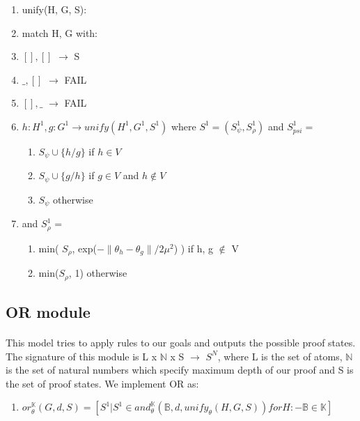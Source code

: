 \documentclass[Other]{iitddiss}
\begin{document}
\begin{enumerate}
	\item unify(H, G, S):
	\item match H, G with:
	\item \([], []\) $\rightarrow$ S
	\item \(\_, []\) $\rightarrow$ FAIL
	\item \([], \_\) $\rightarrow$ FAIL
	\item \(h: H^1, g: G^1 \rightarrow unify(H^1, G^1, S^1)\) where \(S^1 = (S_{\psi}^1, S_{\rho}^1)\)  and  \(S_{psi}^1 = \)
		\begin{enumerate}
			\item \(S_{\psi} \cup \{ h/g\}\) if \(h \in V\)
			\item \(S_{\psi} \cup \{ g/h\}\) if \(g \in V\) and \(h \notin V\)
			\item \(S_{\psi}\) otherwise
		\end{enumerate}
	\item and \(S_{\rho}^1 \) = 
		\begin{enumerate}
			\item min( \(S_{\rho}\), exp(\( - \lVert  {{\theta}_h - {\theta}_g}  \rVert / {2{\mu}^2} \)) ) if h, g $\notin$ V
			\item min(\(S_{\rho}\), 1) otherwise
		\end{enumerate}
\end{enumerate}

\subsection{OR module}
\paragraph{}
This model tries to apply rules to our goals and outputs the possible proof states. The signature of this module is L x $\mathbb{N}$ x S $\rightarrow$ $S^N$, where L is the set of atoms, $\mathbb{N}$ is the set of natural numbers which specify maximum depth of our proof and S is the set of proof states. We implement OR as:

\begin{enumerate}
	\item \( {or_{\theta}^{\mathbb{K}}}(G, d, S) = [S^1 |S^1 \in {and_{\theta}^{\mathbb{K}}(\mathbb{B}, d, {unify_{\theta}(H, G, S)})} for H:-\mathbb{B} \in \mathbb{K}]\)
\end{enumerate}
\end{document}
